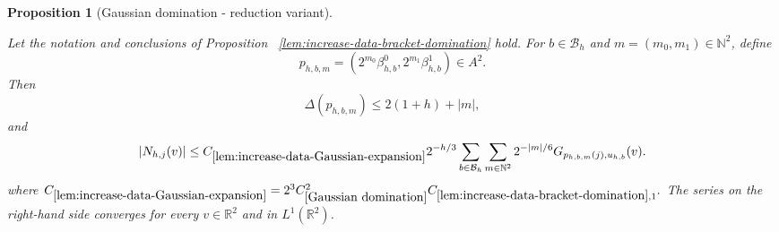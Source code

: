 \documentclass[12pt,reqno]{amsart}
\theoremstyle{plain}
\newtheorem{proposition}[theorem]{Proposition}
\numberwithin{equation}{section}
\theoremstyle{remark}
\newcommand{\uses}[1]{}
\newcommand{\usesdefs}[1]{}
\newcommand{\leanok}{}
\newcommand{\lean}[1]{}
\begin{document}
\begin{proposition}[Gaussian domination - reduction variant]
\label{lem:increase-data-Gaussian-expansion}\uses{Gaussian domination,lem:increase-data-bracket-domination,Operations on spaced sequences,Properties of distance of sequences}\usesdefs{gaussian,bracket bump,multiplicatively spaced monotone sequences,Distance of spaced sequences,geometric parameters,auto:unitary-matrices-definition,2D Gaussians}
\lean{Auto.increaseDataGaussianExpansion}
\leanok
Let the notation and conclusions of Proposition~
\ref{lem:increase-data-bracket-domination} hold. For
\(b\in\mathcal B_h\) and
\(m=(m_0,m_1)\in\mathbb N^2\), define
\begin{equation}\label{auto:Gaussian-domination-rescaled-pairs}
p_{h,b,m}
=
\left(
2^{m_0}\beta_{h,b}^0,
2^{m_1}\beta_{h,b}^1
\right)\in A^2.
\end{equation}
Then
\begin{equation}
    \label{E:increase-data-p-distance}
    \Delta(p_{h,b,m})
    \leq
    2(1+h)
    +
    |m|,
\end{equation}
and
\begin{equation}
    \label{E:increase-data-Gaussian-majorant}
    |N_{h,j}(v)| \leq C_{\ref{lem:increase-data-Gaussian-expansion}} 2^{-h/3} \sum_{b\in\mathcal B_h} \sum_{m\in\mathbb N^2} 2^{-|m|/6} G_{p_{h,b,m}(j),u_{h,b}}(v).
\end{equation}
where $ C_{\ref{lem:increase-data-Gaussian-expansion}}
    =
    2^3C_{\ref{Gaussian domination}}^2C_{\ref{lem:increase-data-bracket-domination},1}.$
The   series on the right-hand side converges for every
\(v\in\mathbb R^2\) and in \(L^1(\mathbb R^2)\).
\end{proposition}
\end{document}
